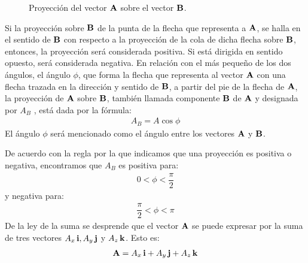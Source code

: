 \documentclass[12pt]{article}
\begin{document}
\begin{figure}[H]
    \centering
    \caption{Proyección del vector $\vb{A}$ sobre el vector $\vb{B}$.}
    \label{fig:figura_01_06}
\end{figure}
Si la proyección sobre $\vb{B}$ de la punta de la flecha que representa a $\vb{A}$, se halla en el sentido de $\vb{B}$ con respecto a la proyección de la cola de dicha flecha sobre $\vb{B}$, entonces, la proyección será considerada positiva. Si está dirigida en sentido opuesto, será considerada negativa. En relación con el más pequeño de los dos ángulos, el ángulo $\phi$, que forma la flecha que representa al vector $\vb{A}$ con una flecha trazada en la dirección y sentido de $\vb{B}$, a partir del pie de la flecha de $\vb{A}$, la proyección de $\vb{A}$ sobre $\vb{B}$, también llamada componente $\vb{B}$ de $\vb{A}$ y designada por $A_{B}$ , está dada por la fórmula:
\begin{align}
    A_{B} = A \cos \phi
    \label{eq:ecuacion_01_06}
\end{align}
El ángulo $\phi$ será mencionado como el ángulo entre los vectores $\vb{A}$ y $\vb{B}$. 
\par
De acuerdo con la regla por la que indicamos que una proyección es positiva o negativa, encontramos que $A_{B}$ es positiva para:
\begin{align*}
    0 < \phi < \dfrac{\pi}{2}
\end{align*}
y negativa para:
\begin{align*}
    \dfrac{\pi}{2} < \phi < \pi
\end{align*}
De la ley de la suma se desprende que el vector $\vb{A}$ se puede expresar por la suma de tres vectores $A_{x} \, \vb{i}, A_{y} \, \vb{j}$ y $A_{z} \, \vb{k}$. Esto es:
\begin{align}
    \vb{A} = A_{x} \, \vb{i} + A_{y} \, \vb{j} + A_{z} \, \vb{k}
    \label{eq:ecuacion_01_07}
\end{align}
\end{document}
